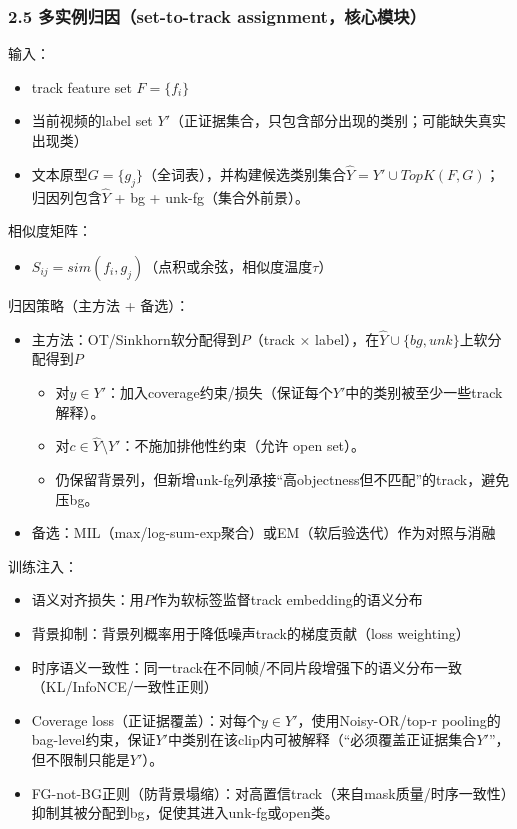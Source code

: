 \documentclass[UTF8]{ctexart}
\begin{document}
\subsubsection*{2.5 多实例归因（set-to-track assignment，核心模块）}
输入：
\begin{itemize}
\item track feature set $F=\{f_i\}$
\item 当前视频的label set $Y'$（正证据集合，只包含部分出现的类别；可能缺失真实出现类）
\item 文本原型$G=\{g_j\}$（全词表），并构建候选类别集合$\hat{Y}=Y'\cup TopK(F, G)$；归因列包含$\hat{Y}$ + bg + unk-fg（集合外前景）。
\end{itemize}
相似度矩阵：
\begin{itemize}
\item $S_{ij} = sim(f_i, g_j)$（点积或余弦，相似度温度$\tau$）
\end{itemize}
归因策略（主方法 + 备选）：
\begin{itemize}
\item 主方法：OT/Sinkhorn软分配得到$P$（track × label），在$\hat{Y}\cup\{bg,unk\}$上软分配得到$P$
\begin{itemize}
\item 对$y\in Y'$：加入coverage约束/损失（保证每个$Y'$中的类别被至少一些track解释）。
\item 对$c\in \hat{Y}\setminus Y'$：不施加排他性约束（允许 open set）。
\item 仍保留背景列，但新增unk-fg列承接“高objectness但不匹配”的track，避免压bg。
\end{itemize}
\item 备选：MIL（max/log-sum-exp聚合）或EM（软后验迭代）作为对照与消融
\end{itemize}
训练注入：
\begin{itemize}
\item 语义对齐损失：用$P$作为软标签监督track embedding的语义分布
\item 背景抑制：背景列概率用于降低噪声track的梯度贡献（loss weighting）
\item 时序语义一致性：同一track在不同帧/不同片段增强下的语义分布一致（KL/InfoNCE/一致性正则）
\item Coverage loss（正证据覆盖）：对每个$y\in Y'$，使用Noisy-OR/top-r pooling的bag-level约束，保证$Y'$中类别在该clip内可被解释（“必须覆盖正证据集合$Y'$”，但不限制只能是$Y'$）。
\item FG-not-BG正则（防背景塌缩）：对高置信track（来自mask质量/时序一致性）抑制其被分配到bg，促使其进入unk-fg或open类。
\end{itemize}
\end{document}
